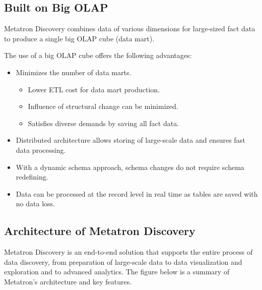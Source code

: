 \documentclass[letterpaper,10pt,english]{sphinxmanual}
\begin{document}
\subsection{Built on Big OLAP}
\label{\detokenize{discovery/part01/overview:big-olap}}
Metatron Discovery combines data of various dimensions for large-sized fact data to produce a single big OLAP cube (data mart).
\begin{quote}

\begin{figure}[H]
\centering

\noindent{}
\end{figure}
\end{quote}

The use of a big OLAP cube offers the following advantages:
\begin{itemize}
\item {} 
Minimizes the number of data marts.
\begin{itemize}
\item {} 
Lower ETL cost for data mart production.

\item {} 
Influence of structural change can be minimized.

\item {} 
Satisfies diverse demands by saving all fact data.

\end{itemize}

\item {} 
Distributed architecture allows storing of large-scale data and ensures fast data processing.

\item {} 
With a dynamic schema approach, schema changes do not require schema redefining.

\item {} 
Data can be processed at the record level in real time as tables are saved with no data loss.

\end{itemize}


\subsection{Architecture of Metatron Discovery}
\label{\detokenize{discovery/part01/overview:id1}}
Metatron Discovery is an end-to-end solution that supports the entire process of data discovery, from preparation of large-scale data to data visualization and exploration and to advanced analytics. The figure below is a summary of Metatron’s architecture and key features.
\begin{quote}

\begin{figure}[H]
\centering

\noindent{}
\end{figure}
\end{quote}
\end{document}
